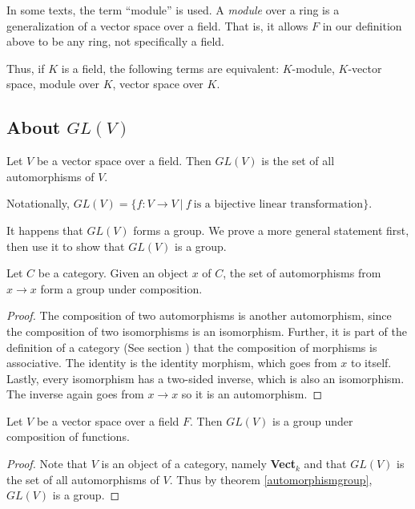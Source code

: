 \begin{note}
  In some texts, the term ``module'' is used. A \textit{module} over a ring is a
  generalization of a vector space over a field. That is, it allows $F$ in our
  definition above to be any ring, not specifically a field.

  Thus, if $K$ is a field, the following terms are equivalent: $K$-module,
  $K$-vector space, module over $K$, vector space over $K$.
\end{note}

\subsection{About $GL(V)$}

\begin{defn}
  Let $V$ be a vector space over a field. Then $GL(V)$ is the set of all
  automorphisms of $V$.

  Notationally,
  $GL(V) = \{ f : V \to V\ |\ f\ \text{is a bijective linear transformation}\}$.
\end{defn}

It happens that $GL(V)$ forms a group. We prove a more general statement first,
then use it to show that $GL(V)$ is a group.

\begin{thm}
  \label{automorphismgroup}
  Let $C$ be a category. Given an object $x$ of $C$, the set of automorphisms
  from $x \to x$ form a group under composition.
\end{thm}

\begin{proof}
  The composition of two automorphisms is another automorphism,
  since the composition of two isomorphisms is an isomorphism. Further, it is
  part of the definition of a category (See section ) that the
  composition of morphisms is associative. The identity is the identity
  morphism, which goes from $x$ to itself. Lastly, every isomorphism has a
  two-sided inverse, which is also an isomorphism. The inverse again goes from
  $x \to x$ so it is an automorphism.
\end{proof}

\begin{cly}
  Let $V$ be a vector space over a field $F$. Then $GL(V)$ is a group under
  composition of functions.
\end{cly}

\begin{proof}
  Note that $V$ is an object of a category, namely \textbf{Vect$_k$} and that
  $GL(V)$ is the set of all automorphisms of $V$. Thus by
  theorem \ref{automorphismgroup}, $GL(V)$ is a group.
\end{proof}
